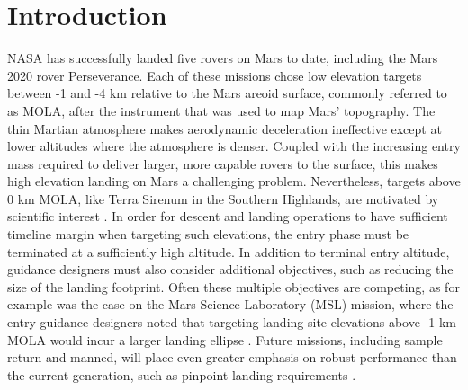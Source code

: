 \chapter{Introduction}





NASA has successfully landed five rovers on Mars to date, including the Mars 2020 rover Perseverance. Each of these missions chose low elevation targets between -1 and -4 km relative to the Mars areoid surface, commonly referred to as MOLA, after the instrument that was used to map Mars' topography. The thin Martian atmosphere makes aerodynamic deceleration ineffective except at lower altitudes where the atmosphere is denser. Coupled with the increasing entry mass required to deliver larger, more capable rovers to the surface, this makes high elevation landing on Mars a challenging problem. Nevertheless, targets above 0 km MOLA, like Terra Sirenum in the Southern Highlands, are motivated by scientific interest \cite{MarsWater}. In order for descent and landing operations to have sufficient timeline margin \cite{BraunMarsEDL,MSL_EDL2} when targeting such elevations, the entry phase must be terminated at a sufficiently high altitude.
In addition to terminal entry altitude, guidance designers must also consider additional objectives, such as reducing the size of the landing footprint. Often these multiple objectives are competing, as for example was the case on the Mars Science Laboratory (MSL) mission, where the entry guidance designers noted that targeting landing site elevations above -1 km MOLA would incur a larger landing ellipse \cite{MSL_EDL2}. 
Future missions, including sample return \cite{MSR} and manned, will place even greater emphasis on robust performance than the current generation, such as pinpoint landing requirements \cite{EvolvableMars}. 

